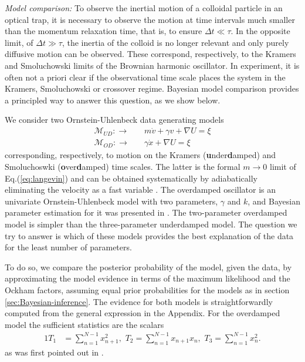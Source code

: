 \documentclass[english,aps, twocolumn, pre,superscriptaddress, notitlepage]{revtex4-1}
\begin{document}
\emph{Model comparison: }To observe the inertial motion of a colloidal
particle in an optical trap, it is necessary to observe the motion
at time intervals much smaller than the momentum relaxation time,
that is, to ensure $\Delta t\ll\tau$. In the opposite limit, of $\Delta t\gg\tau$,
the inertia of the colloid is no longer relevant and only purely diffusive
motion can be observed. These correspond, respectively, to the Kramers
and Smoluchowski limits of the Brownian harmonic oscillator. In experiment,
it is often not a priori clear if the observational time scale places
the system in the Kramers, Smoluchowski or crossover regime. Bayesian
model comparison provides a principled way to answer this question,
as we show below. 

We consider two Ornstein-Uhlenbeck data generating models
\begin{align}
\mathcal{M}_{UD}:\longrightarrow & \quad m\dot{v}+\gamma v+\nabla U=\xi\nonumber \\
\mathcal{M}_{OD}:\longrightarrow & \quad\gamma\dot{x}+\nabla U=\xi
\end{align}
corresponding, respectively, to motion on the Kramers\textbf{\emph{
}}(\textbf{u}nder\textbf{d}amped) and Smoluchoswki (\textbf{o}ver\textbf{d}amped)
time scales. The latter is the formal $m\rightarrow0$ limit of Eq.(\ref{eq:langevin})
and can be obtained systematically by adiabatically eliminating the
velocity as a fast variable \cite{gardiner1984adiabatic}. The overdamped
oscillator is an univariate Ornstein-Uhlenbeck model with two parameters,
$\gamma$ and $k$, and Bayesian parameter estimation for it was presented
in \cite{bera2017fast}. The two-parameter overdamped model is simpler
than the three-parameter underdamped model. The question we try to
answer is which of these models provides the best explanation of the
data for the least number of parameters. 

To do so, we compare the posterior probability of the model, given
the data, by approximating the model evidence in terms of the maximum
likelihood and the Ockham factors, assuming equal prior probabilities
for the models as in section \ref{sec:Bayesian-inference}. The evidence
for both models is straightforwardly computed from the general expression
in the Appendix. For the overdamped model the sufficient statistics
are the scalars
\begin{alignat}{1}
T_{1} & =\sum_{n=1}^{N-1}x_{n+1}^{2},\,\,T_{2}=\sum_{n=1}^{N-1}x_{n+1}x_{n},\,\,T_{3}=\sum_{n=1}^{N-1}x_{n}^{2}.
\end{alignat}
as was first pointed out in \cite{bera2017fast}. 
\end{document}
